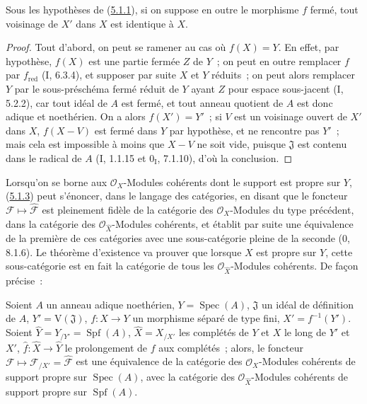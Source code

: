 
\begin{lemma}[5.1.3.1]
\label{III.5.1.3.1-fr}
Sous les hypothèses de (\hyperref[III.5.1.1-fr]{5.1.1}), si on suppose en outre le
morphisme $f$ fermé, tout voisinage de $X'$ dans $X$ est identique à $X$.
\end{lemma}

\begin{proof}
Tout d'abord, on peut se ramener au cas où $f(X)=Y$. En effet, par hypothèse,
$f(X)$ est une partie fermée $Z$ de $Y$~; on peut en outre remplacer $f$ par
$f_{\mathrm{red}}$ (I, 6.3.4), et supposer par suite $X$ et $Y$ réduits~; on peut alors
remplacer $Y$ par le sous-préschéma fermé réduit de $Y$ ayant $Z$ pour espace
sous-jacent (I, 5.2.2), car tout idéal de $A$ est fermé, et tout anneau quotient de
$A$ est donc adique et noethérien. On a alors $f(X')=Y'$~; si $V$ est un voisinage
ouvert de $X'$ dans $X$, $f(X-V)$ est fermé dans $Y$ par hypothèse, et ne rencontre
pas $Y'$~; mais cela est impossible à moins que $X-V$ ne soit vide, puisque
$\mathfrak J$ est contenu dans le radical de $A$ (I, 1.1.15 et $0_{\mathrm I}$,
7.1.10), d'où la conclusion.
\end{proof}

Lorsqu'on se borne aux $\mathcal O_X$-Modules cohérents dont le support est propre
sur $Y$, (\hyperref[III.5.1.3-fr]{5.1.3}) peut s'énoncer, dans le langage des
catégories, en disant que le foncteur
$\mathcal F\mapsto\widehat{\mathcal F}$ est pleinement fidèle de la catégorie des
$\mathcal O_X$-Modules du type précédent, dans la catégorie des
$\mathcal O_{\widehat X}$-Modules cohérents, et établit par suite une équivalence de
la première de ces catégories avec une sous-catégorie pleine de la seconde
($0$, 8.1.6). Le théorème d'existence va prouver que lorsque $X$ est propre sur $Y$,
cette sous-catégorie est en fait la catégorie de tous les
$\mathcal O_{\widehat X}$-Modules cohérents. De façon précise~:

\begin{theorem}[5.1.4]
\label{III.5.1.4-fr}
Soient $A$ un anneau adique noethérien, $Y=\operatorname{Spec}(A)$,
$\mathfrak J$ un idéal de définition de $A$, $Y'=\mathrm V(\mathfrak J)$,
$f:X\to Y$ un morphisme séparé de type fini, $X'=f^{-1}(Y')$. Soient
$\widehat Y=Y_{/Y'}=\operatorname{Spf}(A)$, $\widehat X=X_{/X'}$ les complétés de
$Y$ et $X$ le long de $Y'$ et $X'$, $\widehat f:\widehat X\to\widehat Y$ le
prolongement de $f$ aux complétés~; alors, le foncteur
$\mathcal F\mapsto\mathcal F_{/X'}=\widehat{\mathcal F}$ est une équivalence de la
catégorie des $\mathcal O_X$-Modules cohérents de support propre sur
$\operatorname{Spec}(A)$, avec la catégorie des $\mathcal O_{\widehat X}$-Modules
cohérents de support propre sur $\operatorname{Spf}(A)$.
\end{theorem}

